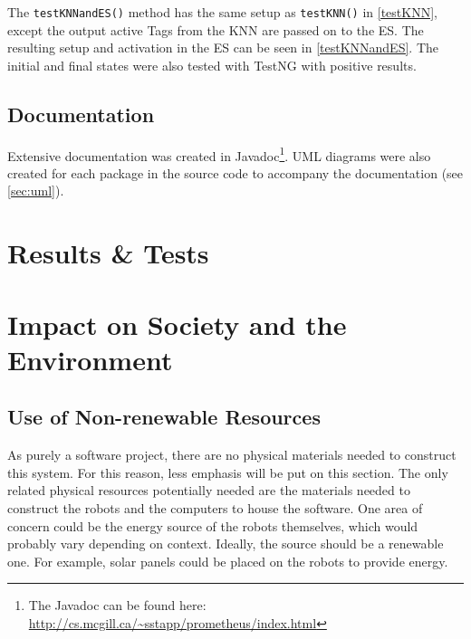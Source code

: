 \documentclass[titlepage,11pt]{article}
\newcommand{\code}[1]{\texttt{#1}}
\begin{document}
The \code{testKNNandES()} method has the same setup as \code{testKNN()} in \autoref{testKNN}, except the output active Tags from the KNN are passed on to the ES. The resulting setup and activation in the ES can be seen in \autoref{testKNNandES}. The initial and final states were also tested with TestNG with positive results.

\subsection{Documentation}

 Extensive documentation was created in Javadoc\footnote{The Javadoc can be found here: \url{http://cs.mcgill.ca/~sstapp/prometheus/index.html}}. UML diagrams were also created for each package in the source code to accompany the documentation (see \autoref{sec:uml}).


\section{Results \& Tests}
\label{sec:results}

\section{Impact on Society and the Environment}
\label{sec:impact}


\subsection{Use of Non-renewable Resources}

As purely a software project, there are no physical materials needed to construct this system. For this reason, less emphasis will be put on this section. The only related physical resources potentially needed are the materials needed to construct the robots and the computers to house the software. One area of concern could be the energy source of the robots themselves, which would probably vary depending on context. Ideally, the source should be a renewable one. For example, solar panels could be placed on the robots to provide energy.
\end{document}
